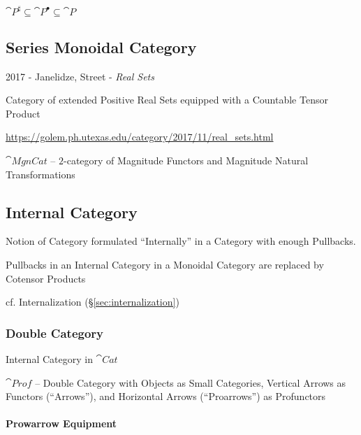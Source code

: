 $\cat{P}^\sharp \subseteq \cat{P}^\bullet \subseteq \cat{P}$



\subsection{Series Monoidal Category}\label{sec:series_meonoidal_category}


2017 - Janelidze, Street - \emph{Real Sets}

Category of extended Positive Real Sets equipped with a Countable Tensor
Product

\url{https://golem.ph.utexas.edu/category/2017/11/real_sets.html}

$\cat{MgnCat}$ -- $2$-category of Magnitude Functors and Magnitude Natural
Transformations



\subsection{Internal Category}\label{sec:internal_category}


Notion of Category formulated ``Internally'' in a Category with enough
Pullbacks.

Pullbacks in an Internal Category in a Monoidal Category are replaced
by Cotensor Products

\fist cf. Internalization (\S\ref{sec:internalization})



\subsubsection{Double Category}\label{sec:double_category}

Internal Category in $\cat{Cat}$

$\cat{Prof}$ -- Double Category with Objects as Small Categories, Vertical
Arrows as Functors (``Arrows''), and Horizontal Arrows (``Proarrows'') as
Profunctors



\paragraph{Prowarrow Equipment}\label{sec:proarrow_equipment}\hfill

